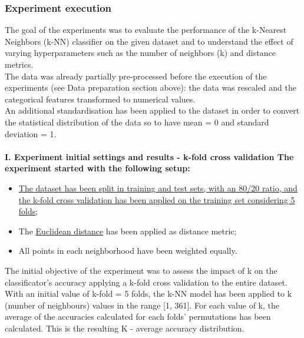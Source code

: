 \documentclass[11pt,a4paper]{article}
\begin{document}
\subsubsection{Experiment execution}
The goal of the experiments was to evaluate the performance of the k-Nearest Neighbors (k-NN) classifier on the given dataset and to understand the effect of varying hyperparameters such as the number of neighbors (k) and distance metrics.\\
The data was already partially pre-processed before the execution of the experiments (see Data preparation section above): the data was rescaled and the categorical features transformed to numerical values. \\
An additional standardisation has been applied to the dataset in order to convert the statistical distribution of the data so to have mean = 0 and standard deviation = 1.
\\
\\
\textbf{I. Experiment initial settings and results - k-fold cross validation
The experiment started with the following setup:}
\begin{itemize}
\item \uline{The dataset has been split in training and test sets, with an 80/20 ratio, and the k-fold cross validation has been applied on the training set considering 5 folds};
\item The \uline{Euclidean distance} has been applied as distance metric;
\item All points in each neighborhood have been weighted equally.
\end{itemize}
The initial objective of the experiment was to assess the impact of k on the classificator’s accuracy applying a k-fold cross validation to the entire dataset. With an initial value of k-fold = 5 folds, the k-NN model has been applied to k (number of neighbours) values in the range [1, 361]. For each value of k, the average of the accuracies calculated for each folds’ permutations has been calculated. This is the resulting K - average accuracy distribution.
\end{document}
